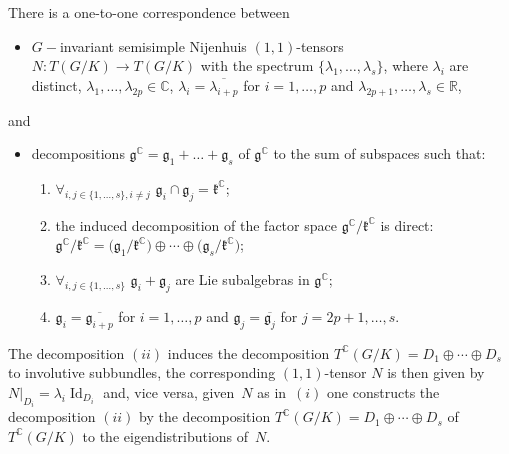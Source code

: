 \begin{Theorem}\label{T1}There is a one-to-one correspondence between
\begin{itemize}\itemsep=0pt
\item[$(i)$] $ G-$invariant semisimple Nijenhuis $(1,1)$-tensors $N\colon T(G/K) \to T(G/K) $
with the spectrum
$\{ \lambda_1, \dots, \lambda_s \} $, where $\lambda_i$ are distinct, $\lambda_1,\dots,\lambda_{2p} \in \mathbb{C}$, $\lambda_i=\overline{\lambda_{i+p}}$ for $i=1,\dots,p$ and $\lambda_{2p+1},\dots,\lambda_s\in\mathbb{R}$,
\end{itemize}
and
\begin{itemize}\itemsep=0pt
\item[$(ii)$] decompositions $\mathfrak{g}^\mathbb{C} = \mathfrak{g}_1 + \dots+ \mathfrak{g}_s $ of $\mathfrak{g}^\mathbb{C}$ to the sum of subspaces such that:
\begin{enumerate}\itemsep=0pt
\item[$1)$] $ \forall_{i,j\in \{1,\dots,s\}, i\not=j }$ $\mathfrak{g}_i\cap\mathfrak{g}_j = \mathfrak{k}^\mathbb{C}$;
\item[$2)$] the induced decomposition of the factor space $\mathfrak{g}^\mathbb{C}/\mathfrak{k}^\mathbb{C}$ is direct: $\mathfrak{g}^\mathbb{C}/\mathfrak{k}^\mathbb{C}=\big(\mathfrak{g}_1/\mathfrak{k}^\mathbb{C}\big) \oplus \cdots \oplus\big(\mathfrak{g}_s/\mathfrak{k}^\mathbb{C}\big)$;
\item[$3)$] $ \forall_{i,j\in \{1,\dots,s\} }$ $\mathfrak{g}_i+\mathfrak{g}_j $ are Lie subalgebras in $\mathfrak{g}^\mathbb{C}$;
\item[$4)$] $\mathfrak{g}_i=\overline{\mathfrak{g}_{i+p}}$ for $i=1,\dots,p$ and $\mathfrak{g}_j=\overline{\mathfrak{g}_j}$ for $j=2p+1,\dots,s$.
\end{enumerate}
\end{itemize}
The decomposition $(ii)$ induces the decomposition $T^\mathbb{C}(G/K)=D_1\oplus\cdots\oplus D_s$ to involutive subbundles, the corresponding $(1,1)$-tensor $N$ is then given by $N|_{D_i}=\lambda_i\operatorname{Id}_{D_i}$ and, vice versa, given~$N$ as in~$(i)$ one constructs the decomposition $(ii)$ by the decomposition $T^\mathbb{C}(G/K)=D_1\oplus\cdots\oplus D_s$ of $T^\mathbb{C}(G/K)$ to the eigendistributions of~$N$.
\end{Theorem}

